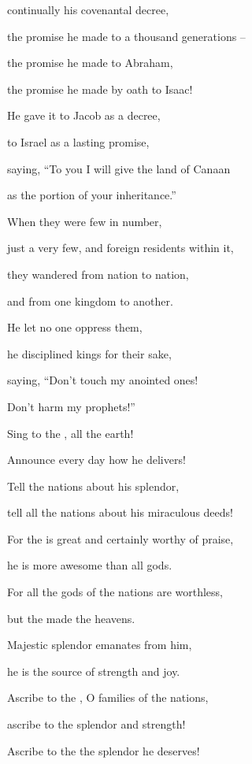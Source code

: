 {continually
his covenantal
decree,
\par }{\Q the promise
he made to a thousand
generations –
\par }{\Q {}the promise
he made
to Abraham,
\par }{\Q the promise he made by oath
to Isaac!
\par }{\Q {}He gave
it to Jacob
as a decree,
\par }{\Q to Israel
as a lasting
promise,
\par }{\Q {}saying,
“To you I will give
the land
of Canaan
\par }{\Q as the portion
of your inheritance.”
\par }{\Q {}When
they were few
in number,
\par }{\Q just a
very few,
and foreign residents within it,
\par }{\Q {}they wandered
from nation
to
nation,
\par }{\Q and from one kingdom
to
another.
\par }{\Q {}He let no
one
oppress
them,
\par }{\Q he disciplined
kings
for their sake,
\par }{\Q {}saying, “Don’t
touch
my anointed ones!
\par }{\Q Don’t
harm
my prophets!”
\par }{\Q {}Sing
to the
{}, all
the earth!
\par }{\Q Announce
every day
how he delivers!
\par }{\Q {}Tell
the nations
about his splendor,
\par }{\Q tell all
the nations
about his miraculous deeds!
\par }{\Q {}For
the {}
is great
and certainly worthy
of praise,
\par }{\Q he is
more
awesome
than all
gods.
\par }{\Q {}For
all
the gods
of the nations
are worthless,
\par }{\Q but the
{}
made
the heavens.
\par }{\Q {}Majestic
splendor
emanates
from him,

\par }{\Q he is the source
of strength
and joy.
\par }{\Q {}Ascribe
to the
{}, O families
of the nations,
\par }{\Q ascribe
to the
{}
splendor
and strength!
\par }{\Q {}Ascribe
to the
{}
the splendor
he deserves!

}
